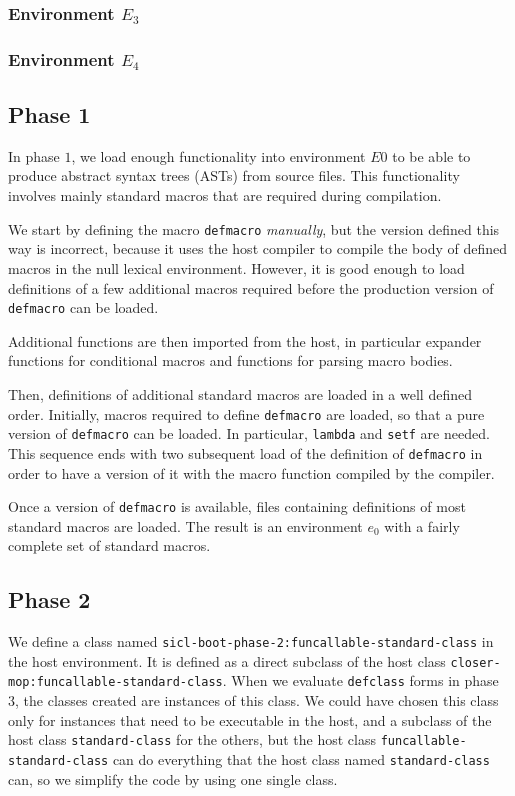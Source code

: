 \subsubsection{Environment $E_3$}

\subsubsection{Environment $E_4$}

\subsection{Phase 1}

In phase $1$, we load enough functionality into environment $E0$ to be
able to produce abstract syntax trees (ASTs) from source files.  This
functionality involves mainly standard macros that are required during
compilation.

We start by defining the macro \texttt{defmacro} \emph{manually}, but
the version defined this way is incorrect, because it uses the host
compiler to compile the body of defined macros in the null lexical
environment.  However, it is good enough to load definitions of
a few additional macros required before the production version of
\texttt{defmacro} can be loaded.

Additional functions are then imported from the host, in particular
expander functions for conditional macros and functions for parsing
macro bodies.

Then, definitions of additional standard macros are loaded in a well
defined order.  Initially, macros required to define \texttt{defmacro}
are loaded, so that a pure \sysname{} version of \texttt{defmacro} can
be loaded.  In particular, \texttt{lambda} and \texttt{setf} are
needed.  This sequence ends with two subsequent load of the \sysname{}
definition of \texttt{defmacro} in order to have a version of it with
the macro function compiled by the \sysname{} compiler.

Once a \sysname{} version of \texttt{defmacro} is available, files
containing definitions of most standard macros are loaded.  The result
is an environment $e_0$ with a fairly complete set of standard
macros.

\subsection{Phase 2}

We define a class named
\texttt{sicl-boot-phase-2:funcallable-standard-class} in the host
environment.  It is defined as a direct subclass of the host class
\texttt{closer-mop:funcallable-standard-class}.  When we
evaluate \texttt{defclass} forms in phase 3, the classes created are
instances of this class.  We could have chosen this class only for
instances that need to be executable in the host, and a subclass of
the host class \texttt{standard-class} for the others, but the host
class \texttt{funcallable-standard-class} can do everything that the
host class named \texttt{standard-class} can, so we simplify the code by
using one single class.

